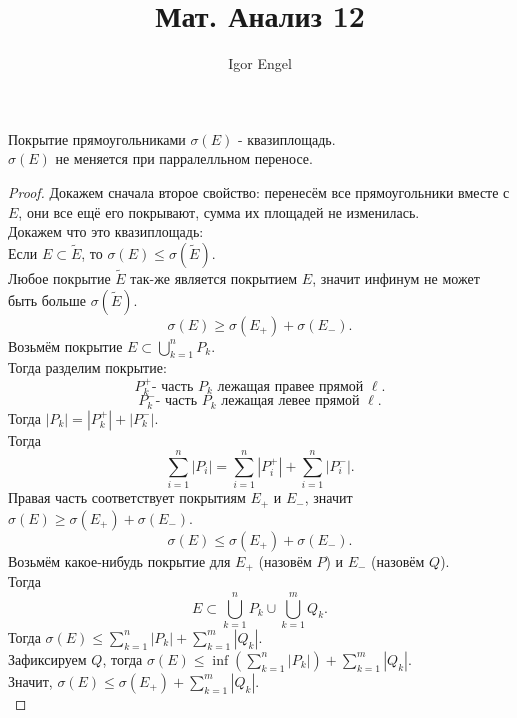 \documentclass[11pt, oneside]{article}   	%
\title{Мат. Анализ 12}
\author{Igor Engel}
\date{}
\begin{document}
\maketitle
\section{}
    \begin{theorem}
        Покрытие прямоугольниками $\sigma(E)$ - квазиплощадь.\\
        $\sigma(E)$  не меняется при парралелльном переносе.
        \begin{proof}
            Докажем сначала второе свойство: перенесём все прямоугольники вместе с $E$, они все ещё его покрывают, сумма их площадей не изменилась.\\
            Докажем что это квазиплощадь:\\
            Если $E \subset \tilde{E}$, то $\sigma(E) \le \sigma(\tilde{E})$.\\
            Любое покрытие $\tilde{E}$ так-же является покрытием $E$, значит инфинум не может быть больше $\sigma(\tilde{E})$.\\
            \[ \sigma(E) \ge  \sigma(E_{+}) + \sigma(E_{-}) .\]
            Возьмём покрытие $E \subset \bigcup_{k = 1}^{n}P_k$.\\
            Тогда разделим покрытие:
            \[ P_{k}^{+} \text{- часть $P_k$ лежащая правее прямой  $\ell$} .\]
        \[ P_{k}^{-} \text{- часть $P_k$ лежащая левее прямой  $\ell$} .\]
            Тогда $|P_{k}| = |P_{k}^{+}| + |P_{k}^{-}|$.\\
            Тогда 
            \[ \sum\limits_{i=1}^{n} |P_i| = \sum\limits_{i=1}^{n} |P_{i}^{+}| + \sum\limits_{i=1}^{n} |P_{i}^{-}|.\] 
            Правая часть соответствует покрытиям $E_{+}$ и $E_-$, значит $\sigma(E) \ge \sigma(E_{+}) + \sigma(E_{-})$.
            \[ \sigma(E) \le \sigma(E_{+}) + \sigma(E_{-}) .\]
            Возьмём какое-нибудь покрытие для $E_{+}$ (назовём $P$) и $E_{-}$ (назовём $Q$).\\
            Тогда 
            \[ E \subset  \bigcup_{k=1}^{n}P_{k} \cup \bigcup_{k=1}^{m} Q_k .\]
            Тогда $\sigma(E) \le \sum\limits_{k=1}^{n} |P_k| + \sum\limits_{k=1}^{m} |Q_k|$.\\
            Зафиксируем $Q$, тогда $\sigma(E) \le \inf\left( \sum\limits_{k=1}^{n} |P_k| \right) + \sum\limits_{k=1}^{m} |Q_k|$.\\
            Значит, $\sigma(E) \le \sigma(E_{+}) + \sum\limits_{k=1}^{m} |Q_k|$.\\

\end{proof}
\end{theorem}
\end{document}
